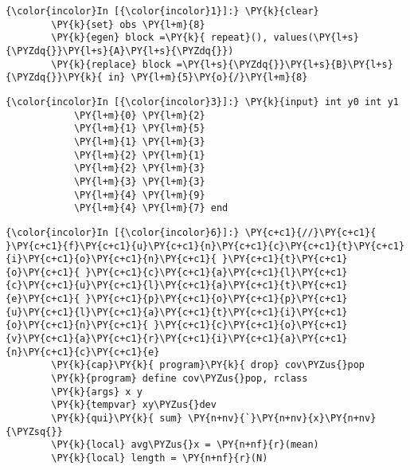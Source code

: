 \documentclass[11pt,notitlepage]{article}\usepackage[]{graphicx}\usepackage[]{color}
\makeatletter
\newenvironment{kframe}{%
 \def\at@end@of@kframe{}%
 \ifinner\ifhmode%
  \def\at@end@of@kframe{\end{minipage}}%
  \begin{minipage}{\columnwidth}%
 \fi\fi%
 \def\FrameCommand##1{\hskip\@totalleftmargin \hskip-\fboxsep
 \colorbox{shadecolor}{##1}\hskip-\fboxsep
     \hskip-\linewidth \hskip-\@totalleftmargin \hskip\columnwidth}%
 \MakeFramed {\advance\hsize-\width
   \@totalleftmargin\z@ \linewidth\hsize
   \@setminipage}}%
 {\par\unskip\endMakeFramed%
 \at@end@of@kframe}
\newenvironment{knitrout}{}{} %
\makeatother
\begin{document}
\begin{knitrout}
\color{fgcolor}\begin{kframe}

    \begin{Verbatim}[commandchars=\\\{\}]
{\color{incolor}In [{\color{incolor}1}]:} \PY{k}{clear}
        \PY{k}{set} obs \PY{l+m}{8}
        \PY{k}{egen} block =\PY{k}{ repeat}(), values(\PY{l+s}{\PYZdq{}}\PY{l+s}{A}\PY{l+s}{\PYZdq{}})
        \PY{k}{replace} block =\PY{l+s}{\PYZdq{}}\PY{l+s}{B}\PY{l+s}{\PYZdq{}}\PY{k}{ in} \PY{l+m}{5}\PY{o}{/}\PY{l+m}{8}
\end{Verbatim}

    \begin{Verbatim}[commandchars=\\\{\}]
{\color{incolor}In [{\color{incolor}3}]:} \PY{k}{input} int y0 int y1
        	\PY{l+m}{0} \PY{l+m}{2}
        	\PY{l+m}{1} \PY{l+m}{5}
        	\PY{l+m}{1} \PY{l+m}{3}
        	\PY{l+m}{2} \PY{l+m}{1}	
        	\PY{l+m}{2} \PY{l+m}{3}
        	\PY{l+m}{3} \PY{l+m}{3}
        	\PY{l+m}{4} \PY{l+m}{9}
        	\PY{l+m}{4} \PY{l+m}{7} end
\end{Verbatim}


    \begin{Verbatim}[commandchars=\\\{\}]
{\color{incolor}In [{\color{incolor}6}]:} \PY{c+c1}{//}\PY{c+c1}{ }\PY{c+c1}{f}\PY{c+c1}{u}\PY{c+c1}{n}\PY{c+c1}{c}\PY{c+c1}{t}\PY{c+c1}{i}\PY{c+c1}{o}\PY{c+c1}{n}\PY{c+c1}{ }\PY{c+c1}{t}\PY{c+c1}{o}\PY{c+c1}{ }\PY{c+c1}{c}\PY{c+c1}{a}\PY{c+c1}{l}\PY{c+c1}{c}\PY{c+c1}{u}\PY{c+c1}{l}\PY{c+c1}{a}\PY{c+c1}{t}\PY{c+c1}{e}\PY{c+c1}{ }\PY{c+c1}{p}\PY{c+c1}{o}\PY{c+c1}{p}\PY{c+c1}{u}\PY{c+c1}{l}\PY{c+c1}{a}\PY{c+c1}{t}\PY{c+c1}{i}\PY{c+c1}{o}\PY{c+c1}{n}\PY{c+c1}{ }\PY{c+c1}{c}\PY{c+c1}{o}\PY{c+c1}{v}\PY{c+c1}{a}\PY{c+c1}{r}\PY{c+c1}{i}\PY{c+c1}{a}\PY{c+c1}{n}\PY{c+c1}{c}\PY{c+c1}{e}
        \PY{k}{cap}\PY{k}{ program}\PY{k}{ drop} cov\PYZus{}pop
        \PY{k}{program} define cov\PYZus{}pop, rclass
        \PY{k}{args} x y	
        \PY{k}{tempvar} xy\PYZus{}dev 
        \PY{k}{qui}\PY{k}{ sum} \PY{n+nv}{`}\PY{n+nv}{x}\PY{n+nv}{\PYZsq{}}
        \PY{k}{local} avg\PYZus{}x = \PY{n+nf}{r}(mean)
        \PY{k}{local} length = \PY{n+nf}{r}(N)	
        

\end{Verbatim}
\end{kframe}
\end{knitrout}
\end{document}
